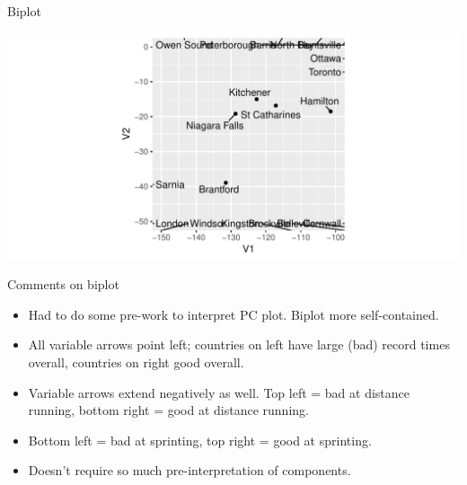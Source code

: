 \begin{frame}{Biplot}

\begin{knitrout}
\color{fgcolor}
\includegraphics[width=\maxwidth]{figure/biplot2-1} 

\end{knitrout}

  
\end{frame}

\begin{frame}{Comments on biplot}
  
  \begin{itemize}
  \item Had to do some pre-work to interpret PC plot. Biplot more self-contained.
  \item All variable arrows point left; countries on left have large
    (bad) record times overall, countries on right good overall.
  \item Variable arrows extend negatively as well. Top left = bad at
    distance running, bottom right = good at distance running.
  \item Bottom left = bad at sprinting, top right = good at
    sprinting.
  \item Doesn't require so much pre-interpretation of components.
  \end{itemize}
  
\end{frame}

